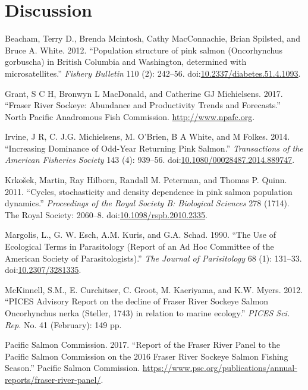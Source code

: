 \documentclass[fleqn,10pt]{wlpeerj} %
\begin{document}
\section*{Discussion}\label{discussion}

\hypertarget{refs}{}
\hypertarget{ref-Beacham2012}{}
Beacham, Terry D., Brenda Mcintosh, Cathy MacConnachie, Brian Spilsted,
and Bruce A. White. 2012. ``Population structure of pink salmon
(Oncorhynchus gorbuscha) in British Columbia and Washington, determined
with microsatellites.'' \emph{Fishery Bulletin} 110 (2): 242--56.
doi:\href{https://doi.org/10.2337/diabetes.51.4.1093}{10.2337/diabetes.51.4.1093}.

\hypertarget{ref-Grant2017}{}
Grant, S C H, Bronwyn L MacDonald, and Catherine GJ Michielsens. 2017.
``Fraser River Sockeye: Abundance and Productivity Trends and
Forecasts.'' North Pacific Anadromous Fish Commission.
\url{http://www.npafc.org}.

\hypertarget{ref-Irvine2014}{}
Irvine, J R, C. J.G. Michielsens, M. O'Brien, B A White, and M Folkes.
2014. ``Increasing Dominance of Odd-Year Returning Pink Salmon.''
\emph{Transactions of the American Fisheries Society} 143 (4): 939--56.
doi:\href{https://doi.org/10.1080/00028487.2014.889747}{10.1080/00028487.2014.889747}.

\hypertarget{ref-Krkosek2011}{}
Krkošek, Martin, Ray Hilborn, Randall M. Peterman, and Thomas P. Quinn.
2011. ``Cycles, stochasticity and density dependence in pink salmon
population dynamics.'' \emph{Proceedings of the Royal Society B:
Biological Sciences} 278 (1714). The Royal Society: 2060--8.
doi:\href{https://doi.org/10.1098/rspb.2010.2335}{10.1098/rspb.2010.2335}.

\hypertarget{ref-Margolis1990}{}
Margolis, L., G. W. Esch, A.M. Kuris, and G.A. Schad. 1990. ``The Use of
Ecological Terms in Parasitology (Report of an Ad Hoc Committee of the
American Society of Parasitologists).'' \emph{The Journal of
Parisitology} 68 (1): 131--33.
doi:\href{https://doi.org/10.2307/3281335}{10.2307/3281335}.

\hypertarget{ref-McKinnell2012}{}
McKinnell, S.M., E. Curchitser, C. Groot, M. Kaeriyama, and K.W. Myers.
2012. ``PICES Advisory Report on the decline of Fraser River Sockeye
Salmon Oncorhynchus nerka (Steller, 1743) in relation to marine
ecology.'' \emph{PICES Sci. Rep.} No. 41 (February): 149 pp.

\hypertarget{ref-PacificSalmonCommission2017}{}
Pacific Salmon Commission. 2017. ``Report of the Fraser River Panel to
the Pacific Salmon Commission on the 2016 Fraser River Sockeye Salmon
Fishing Season.'' Pacific Salmon Commission.
\url{https://www.psc.org/publications/annual-reports/fraser-river-panel/}.
\end{document}
